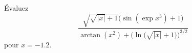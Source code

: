 \begin{exercice}\label{exoSC_serie1-0001}

	Évaluez
	\begin{equation}
		\frac{  \sqrt{\sqrt{| x |}+1}\big( \sin(\exp x^3)+1 \big)    }{ \arctan(x^2)+\Big( \ln\big( \sqrt{| x |}+1 \big) \Big)^{3/2} }
	\end{equation}
	pour $x=-1.2$.

\end{exercice}

